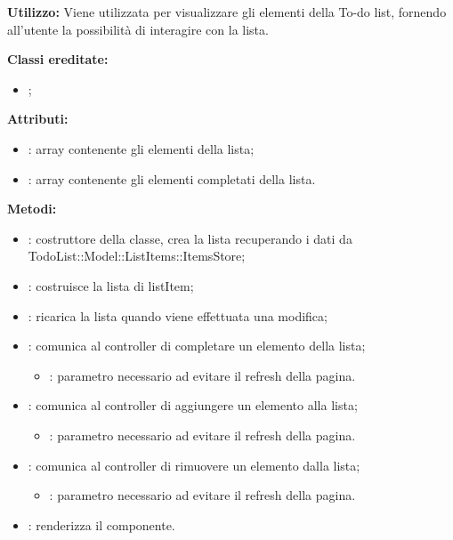 \textbf{Utilizzo:}
Viene utilizzata per visualizzare gli elementi della To-do list, fornendo all'utente la possibilità di interagire con la lista.

\textbf{Classi ereditate:}
\begin{itemize}
	\item {};
\end{itemize}

\textbf{Attributi:}
\begin{itemize}
	\item {}: array contenente gli elementi della lista;
	\item {}: array contenente gli elementi completati della lista.
\end{itemize}

\textbf{Metodi:}
\begin{itemize}
	\item {}: costruttore della classe, crea la lista recuperando i dati da TodoList::Model::ListItems::ItemsStore;
	\item {}: costruisce la lista di listItem;
	\item {}: ricarica la lista quando viene effettuata una modifica;
	\item {}: comunica al controller di completare un elemento della lista;
		\begin{itemize}
			\item {}: parametro necessario ad evitare il refresh della pagina. 
		\end{itemize}
	\item {}: comunica al controller di aggiungere un elemento alla lista;
		\begin{itemize}
			\item {}: parametro necessario ad evitare il refresh della pagina.
		\end{itemize}
	\item {}: comunica al controller di rimuovere un elemento dalla lista;
		\begin{itemize}
			\item {}: parametro necessario ad evitare il refresh della pagina.
		\end{itemize}
	\item {}: renderizza il componente.
\end{itemize}


